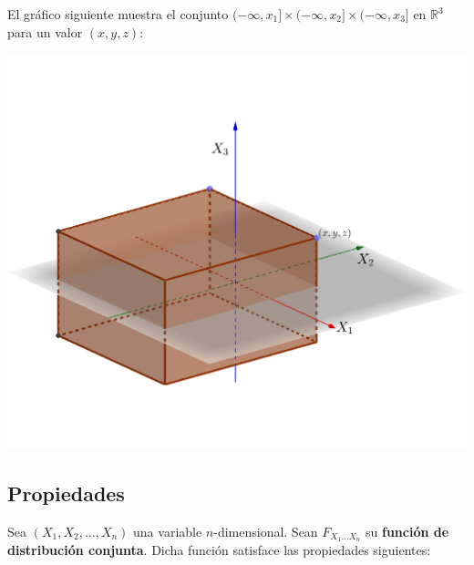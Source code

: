 \documentclass[]{book}
\begin{document}
El gráfico siguiente muestra el conjunto \((-\infty,x_1]\times (-\infty,x_2]\times (-\infty,x_3]\) en \(\mathbb{R}^3\) para un valor \((x,y,z)\):

\includegraphics{Images/Fx1x2x3.png}

\hypertarget{propiedades-5}{%
\subsection{Propiedades}\label{propiedades-5}}

Sea \((X_1,X_2,\ldots,X_n)\) una variable \(n\)-dimensional. Sean \(F_{X_1\ldots X_n}\) su \textbf{función de distribución conjunta}. Dicha función satisface las propiedades siguientes:
\end{document}

